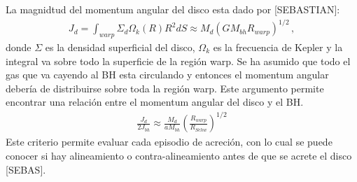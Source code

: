 La magnidtud del momentum angular del disco esta dado por [SEBASTIAN]:
%
\begin{align}
    J_{d}=\int_{warp} \Sigma_{d}\Omega_{k}(R)R^{2}dS \approx M_{d}(GM_{bh}R_{warp})^{1/2}\,,
    \label{eq: magnitid J_disco}
\end{align}
%
donde $\Sigma$ es la densidad superficial del disco, $\Omega_{k}$ es la frecuencia de Kepler y la integral va sobre todo la superficie de la región warp. Se ha asumido que todo el gas que va cayendo al BH esta circulando y entonces el momentum angular debería de distribuirse sobre toda la región warp. Este argumento permite encontrar una relación entre el momentum angular del disco y el BH.
%
\begin{align}
    \frac{J_{d}}{2J_{bh}}\approx \frac{M_{d}}{aM_{bh}}\left(\frac{R_{warp}}{R_{Schw}} \right)^{1/2}
\end{align}
%
Este criterio permite evaluar cada episodio de acreción, con lo cual se puede conocer si hay alineamiento o contra-alineamiento antes de que se acrete el disco [SEBAS]. 

